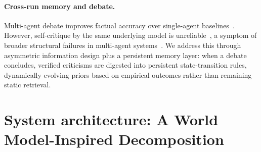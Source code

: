\documentclass[11pt]{article}
\begin{document}
\paragraph{Cross-run memory and debate.} 
Multi-agent debate improves factual accuracy over single-agent baselines~\citep{du2023,liang2023}. However, self-critique by the same underlying model is unreliable~\citep{huang2024}, a symptom of broader structural failures in multi-agent systems~\citep{cemri2025}. We address this through asymmetric information design plus a persistent memory layer: when a debate concludes, verified criticisms are digested into persistent state-transition rules, dynamically evolving priors based on empirical outcomes rather than remaining static retrieval.

\section{System architecture: A World Model-Inspired Decomposition}
\label{sec:system}
\end{document}
